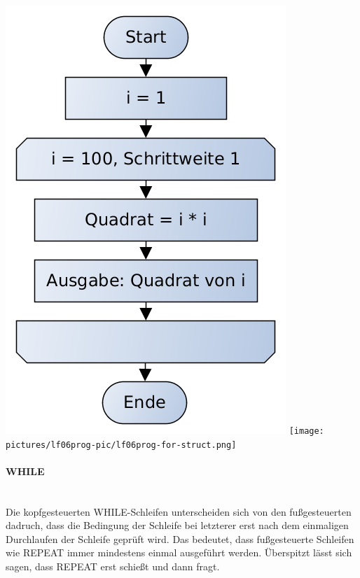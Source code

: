\includegraphics[scale=0.4]{pictures/lf06prog-pic/lf06prog-for-pap.png}
\texttt{[image: pictures/lf06prog-pic/lf06prog-for-struct.png]}

\paragraph{WHILE}~\\

Die kopfgesteuerten WHILE-Schleifen unterscheiden sich von den fußgesteuerten dadruch, dass die Bedingung der Schleife bei letzterer erst nach dem einmaligen Durchlaufen der Schleife geprüft wird. Das bedeutet, dass fußgesteuerte Schleifen wie REPEAT immer mindestens einmal ausgeführt werden. Überspitzt lässt sich sagen, dass REPEAT erst schießt und dann fragt.

